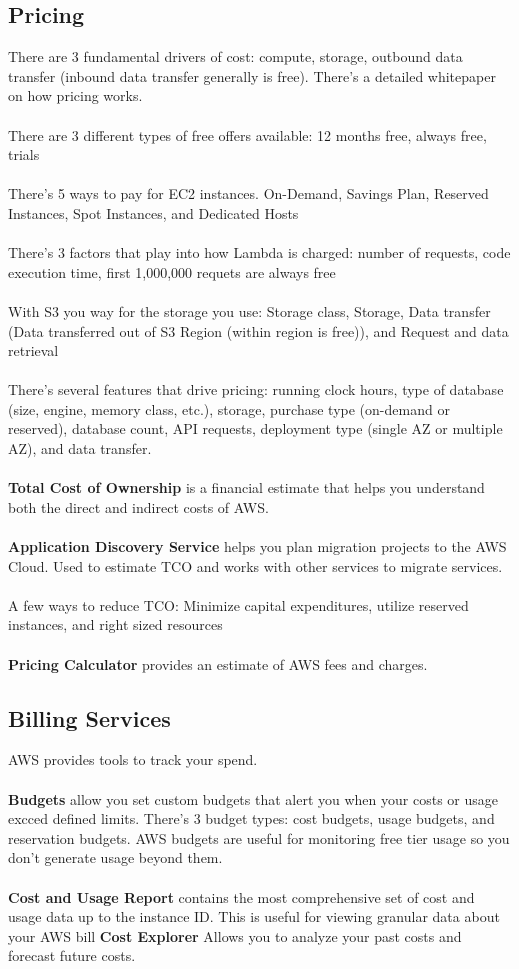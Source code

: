 \documentclass{article}%
\begin{document}
\subsection{Pricing}
There are 3 fundamental drivers of cost: compute, storage, outbound data transfer (inbound data transfer generally is free).
There's a detailed whitepaper on how pricing works. \\ \\
There are 3 different types of free offers available: 12 months free, always free, trials \\ \\
There's 5 ways to pay for EC2 instances. On-Demand, Savings Plan, Reserved Instances, Spot Instances, and Dedicated Hosts \\ \\
There's 3 factors that play into how Lambda is charged: number of requests, code execution time, first 1,000,000 requets are always free  \\ \\
With S3 you way for the storage you use: Storage class, Storage, Data transfer (Data transferred out of S3 Region (within region is free)), and Request and data retrieval \\ \\
There's several features that drive pricing: running clock hours, type of database (size, engine, memory class, etc.), storage, purchase type (on-demand or reserved), database count, API requests, deployment type (single AZ or multiple AZ), and data transfer. \\ \\
\textbf{Total Cost of Ownership} is a financial estimate that helps you understand both the direct and indirect costs of AWS. \\ \\
\textbf{Application Discovery Service} helps you plan migration projects to the AWS Cloud. Used to estimate TCO and works with other services to migrate services.  \\ \\
A few ways to reduce TCO: Minimize capital expenditures, utilize reserved instances, and right sized resources \\ \\
\textbf{Pricing Calculator} provides an estimate of AWS fees and charges.
\subsection{Billing Services}
AWS provides tools to track your spend. \\ \\
\textbf{Budgets} allow you set custom budgets that alert you when your costs or usage excced defined limits. There's 3 budget types: cost budgets, usage budgets, and reservation budgets. AWS budgets are useful for monitoring free tier usage so you don't generate usage beyond them. \\ \\
\textbf{Cost and Usage Report} contains the most comprehensive set of cost and usage data up to the instance ID. This is useful for viewing granular data about your AWS bill
\textbf{Cost Explorer} Allows you to analyze your past costs and forecast future costs. 
\end{document}
